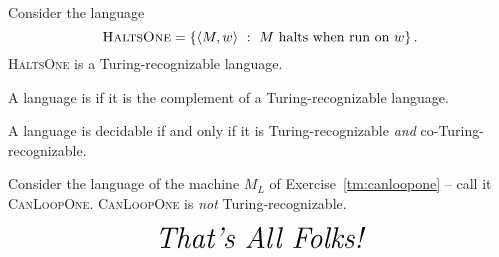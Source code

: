 \documentclass[twoside,letterpaper,openany]{book}
\begin{document}
\begin{stmt3}
Consider the language \[\textsc{HaltsOne} = \left\lbrace {\langle{M, w}\rangle}\ :\ M~\textrm{halts when run on}~w \right\rbrace.\]
\textsc{HaltsOne} is a Turing-recognizable language.
\end{stmt3}

\begin{defn}
A language is  if it is the complement of a Turing-recognizable language.
\end{defn}

\begin{thm3}
A language is decidable if and only if it is Turing-recognizable \emph{and} co-Turing-recognizable.
\end{thm3}

\begin{stmt3}
Consider the language of the machine $M_L$ of Exercise~\ref{tm:canloopone} -- call it \textsc{CanLoopOne}. 
\textsc{CanLoopOne} is \emph{not} Turing-recognizable.
\end{stmt3}

\vspace{1in}
\[\huge\textit{That's All Folks!}\]













\end{document}
